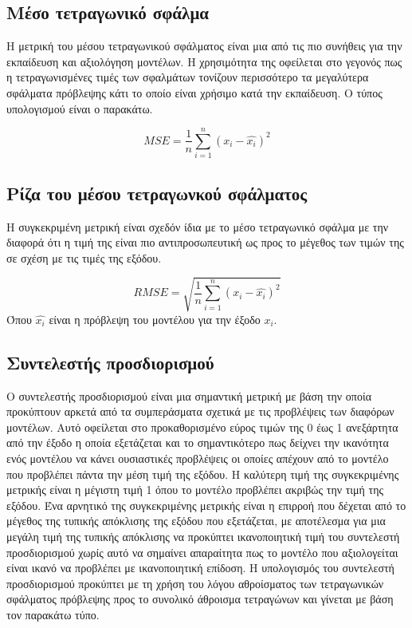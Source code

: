 \subsection{Μέσο τετραγωνικό σφάλμα}
Η μετρική του μέσου τετραγωνικού σφάλματος είναι μια από τις πιο συνήθεις για την εκπαίδευση και αξιολόγηση μοντέλων. Η χρησιμότητα της οφείλεται στο γεγονός πως η τετραγωνισμένες τιμές των σφαλμάτων τονίζουν περισσότερο τα μεγαλύτερα σφάλματα πρόβλεψης κάτι το οποίο είναι χρήσιμο κατά την εκπαίδευση. Ο τύπος υπολογισμού είναι ο παρακάτω.

$$MSE=\frac{1}{n}\sum_{i=1}^{n} {\left(x_{i}-\hat{x_{i}}\right)}^2$$

\subsection{Ρίζα του μέσου τετραγωνκού σφάλματος}
Η συγκεκριμένη μετρική είναι σχεδόν ίδια με το μέσο τετραγωνικό σφάλμα με την διαφορά ότι η τιμή της είναι πιο αντιπροσωπευτική ως προς το μέγεθος των τιμών της σε σχέση με τις τιμές της εξόδου.

$$RMSE=\sqrt{\frac{1}{n}\sum_{i=1}^{n} {\left(x_{i}-\hat{x_{i}}\right)}^2}$$
Όπου $\hat{x_{i}}$ είναι η πρόβλεψη του μοντέλου για την έξοδο $x_i$.

\subsection{Συντελεστής προσδιορισμού}
Ο συντελεστής προσδιορισμού  είναι μια σημαντική μετρική με βάση την οποία προκύπτουν αρκετά από τα συμπεράσματα σχετικά με τις προβλέψεις των διαφόρων μοντέλων. Αυτό οφείλεται στο προκαθορισμένο εύρος τιμών της 0 έως 1 ανεξάρτητα από την έξοδο η οποία εξετάζεται και το σημαντικότερο πως δείχνει την ικανότητα ενός μοντέλου να κάνει ουσιαστικές προβλέψεις οι οποίες απέχουν από το μοντέλο που προβλέπει πάντα την μέση τιμή της εξόδου. Η καλύτερη τιμή της συγκεκριμένης μετρικής είναι η μέγιστη τιμή 1 όπου το μοντέλο προβλέπει ακριβώς την τιμή της εξόδου. Ένα αρνητικό της συγκεκριμένης μετρικής είναι η επιρροή που δέχεται από το μέγεθος της τυπικής απόκλισης της εξόδου που εξετάζεται, με αποτέλεσμα για μια μεγάλη τιμή της τυπικής απόκλισης να προκύπτει ικανοποιητική τιμή του συντελεστή προσδιορισμού χωρίς αυτό να σημαίνει απαραίτητα πως το μοντέλο που αξιολογείται είναι ικανό να προβλέπει με ικανοποιητική επίδοση. Η υπολογισμός του συντελεστή προσδιορισμού προκύπτει με τη χρήση του λόγου αθροίσματος των τετραγωνικών σφάλματος πρόβλεψης  προς το συνολικό άθροισμα τετραγώνων  και γίνεται με βάση τον παρακάτω τύπο.

